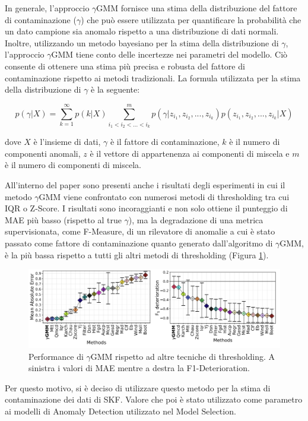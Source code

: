 In generale, l'approccio $\gamma$GMM fornisce una stima della distribuzione del fattore di contaminazione ($\gamma$) che può essere utilizzata per quantificare la probabilità che un dato campione sia anomalo rispetto a una distribuzione di dati normali. Inoltre, utilizzando un metodo bayesiano per la stima della distribuzione di $\gamma$, l'approccio $\gamma$GMM tiene conto delle incertezze nei parametri del modello. Ciò consente di ottenere una stima più precisa e robusta del fattore di contaminazione rispetto ai metodi tradizionali.
La formula utilizzata per la stima della distribuzione di $\gamma$ è la seguente:

\[p(\gamma | X) = \sum_{k=1}^{\infty} p(k | X) \sum_{i_1 < i_2 <...< i_k}^{m} p(\gamma | z_{i_1}, z_{i_2},..., z_{i_k}) p(z_{i_1}, z_{i_2},..., z_{i_k} | X)\]

dove $X$ è l'insieme di dati, $\gamma$ è il fattore di contaminazione, $k$ è il numero di componenti anomali, $z$ è il vettore di appartenenza ai componenti di miscela e $m$ è il numero di componenti di miscela.

All'interno del paper sono presenti anche i risultati degli esperimenti in cui il metodo $\gamma$GMM viene confrontato con numerosi metodi di thresholding tra cui IQR o Z-Score. I risultati sono incoraggianti e non solo ottiene il punteggio di MAE più basso (rispetto al true $\gamma$), ma la degradazione di una metrica supervisionata, come F-Measure, di un rilevatore di anomalie a cui è stato passato come fattore di contaminazione quanto generato dall'algoritmo di $\gamma$GMM, è la più bassa rispetto a tutti gli altri metodi di thresholding (Figura \ref{ygmm2}). 

\begin{figure}[t]
	\centering
	\includegraphics[width=14cm, scale=1]{images/ygmm2}
	\caption{Performance di $\gamma$GMM rispetto ad altre tecniche di thresholding. A sinistra i valori di MAE mentre a destra la F1-Deterioration.}
	\label{ygmm2}
\end{figure}

Per questo motivo, si è deciso di utilizzare questo metodo per la stima di contaminazione dei dati di SKF. Valore che poi è stato utilizzato come parametro ai modelli di Anomaly Detection utilizzato nel Model Selection.
